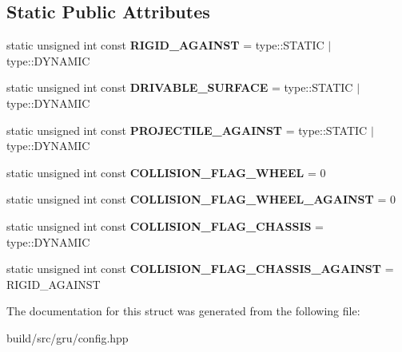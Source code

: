\subsection*{\-Static \-Public \-Attributes}
\begin{DoxyCompactItemize}
\item 
\hypertarget{structglutpp_1_1filter_ac9236e53cab2b418c335beb6647ea0dc}{static unsigned int const {\bfseries \-R\-I\-G\-I\-D\-\_\-\-A\-G\-A\-I\-N\-S\-T} = type\-::\-S\-T\-A\-T\-I\-C $|$ type\-::\-D\-Y\-N\-A\-M\-I\-C}\label{structglutpp_1_1filter_ac9236e53cab2b418c335beb6647ea0dc}

\item 
\hypertarget{structglutpp_1_1filter_a04227f34514ca61aad63a4459d1c481a}{static unsigned int const {\bfseries \-D\-R\-I\-V\-A\-B\-L\-E\-\_\-\-S\-U\-R\-F\-A\-C\-E} = type\-::\-S\-T\-A\-T\-I\-C $|$ type\-::\-D\-Y\-N\-A\-M\-I\-C}\label{structglutpp_1_1filter_a04227f34514ca61aad63a4459d1c481a}

\item 
\hypertarget{structglutpp_1_1filter_a2c52a3d89c7fcc831148d70cd0261bab}{static unsigned int const {\bfseries \-P\-R\-O\-J\-E\-C\-T\-I\-L\-E\-\_\-\-A\-G\-A\-I\-N\-S\-T} = type\-::\-S\-T\-A\-T\-I\-C $|$ type\-::\-D\-Y\-N\-A\-M\-I\-C}\label{structglutpp_1_1filter_a2c52a3d89c7fcc831148d70cd0261bab}

\item 
\hypertarget{structglutpp_1_1filter_a1fb51c21e3317be947460ef8a68e4748}{static unsigned int const {\bfseries \-C\-O\-L\-L\-I\-S\-I\-O\-N\-\_\-\-F\-L\-A\-G\-\_\-\-W\-H\-E\-E\-L} = 0}\label{structglutpp_1_1filter_a1fb51c21e3317be947460ef8a68e4748}

\item 
\hypertarget{structglutpp_1_1filter_a6d9d204a88fa7e232e5bd4e2fa39bd91}{static unsigned int const {\bfseries \-C\-O\-L\-L\-I\-S\-I\-O\-N\-\_\-\-F\-L\-A\-G\-\_\-\-W\-H\-E\-E\-L\-\_\-\-A\-G\-A\-I\-N\-S\-T} = 0}\label{structglutpp_1_1filter_a6d9d204a88fa7e232e5bd4e2fa39bd91}

\item 
\hypertarget{structglutpp_1_1filter_a8165204b48d01a864d920496c130f366}{static unsigned int const {\bfseries \-C\-O\-L\-L\-I\-S\-I\-O\-N\-\_\-\-F\-L\-A\-G\-\_\-\-C\-H\-A\-S\-S\-I\-S} = type\-::\-D\-Y\-N\-A\-M\-I\-C}\label{structglutpp_1_1filter_a8165204b48d01a864d920496c130f366}

\item 
\hypertarget{structglutpp_1_1filter_a1b32f4baf70f048fc00c9610c4331bb0}{static unsigned int const {\bfseries \-C\-O\-L\-L\-I\-S\-I\-O\-N\-\_\-\-F\-L\-A\-G\-\_\-\-C\-H\-A\-S\-S\-I\-S\-\_\-\-A\-G\-A\-I\-N\-S\-T} = \-R\-I\-G\-I\-D\-\_\-\-A\-G\-A\-I\-N\-S\-T}\label{structglutpp_1_1filter_a1b32f4baf70f048fc00c9610c4331bb0}

\end{DoxyCompactItemize}


\-The documentation for this struct was generated from the following file\-:\begin{DoxyCompactItemize}
\item 
build/src/gru/config.\-hpp\end{DoxyCompactItemize}
